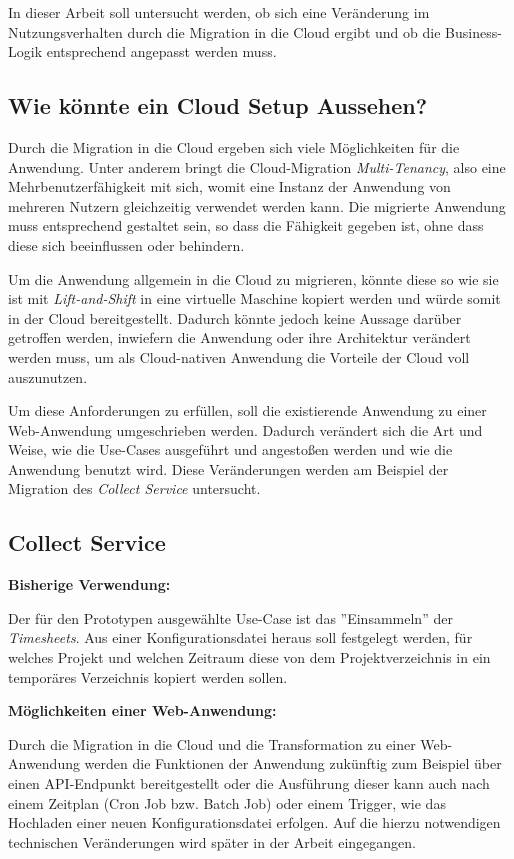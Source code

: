 In dieser Arbeit soll untersucht werden, ob sich eine Veränderung im Nutzungsverhalten durch die Migration in die Cloud ergibt und ob die Business-Logik entsprechend angepasst werden muss. \pagebreak

\subsection{Wie könnte ein Cloud Setup Aussehen?}
Durch die Migration in die Cloud ergeben sich viele Möglichkeiten für die Anwendung. Unter anderem bringt die Cloud-Migration \textit{\gls{Multi-Tenancy}}, also eine Mehrbenutzerfähigkeit mit sich, womit eine Instanz der Anwendung von mehreren Nutzern gleichzeitig verwendet werden kann. Die migrierte Anwendung muss entsprechend gestaltet sein, so dass die Fähigkeit gegeben ist, ohne dass diese sich beeinflussen oder behindern.

Um die Anwendung allgemein in die Cloud zu migrieren, könnte diese so wie sie ist mit \textit{Lift-and-Shift} in eine virtuelle Maschine kopiert werden und würde somit in der Cloud bereitgestellt. Dadurch könnte jedoch keine Aussage darüber getroffen werden, inwiefern die Anwendung oder ihre Architektur verändert werden muss, um als Cloud-nativen Anwendung die Vorteile der Cloud voll auszunutzen.

Um diese Anforderungen zu erfüllen, soll die existierende Anwendung zu einer Web-Anwendung umgeschrieben werden. Dadurch verändert sich die Art und Weise, wie die Use-Cases ausgeführt und angestoßen werden und wie die Anwendung benutzt wird. Diese Veränderungen werden am Beispiel der Migration des \textit{Collect Service} untersucht.

\subsection{Collect Service}
\textbf{Bisherige Verwendung:}

Der für den Prototypen ausgewählte Use-Case ist das ''Einsammeln'' der \textit{\glspl{Timesheet}}. Aus einer Konfigurationsdatei heraus soll festgelegt werden, für welches Projekt und welchen Zeitraum diese von dem Projektverzeichnis in ein temporäres Verzeichnis kopiert werden sollen. 

\textbf{Möglichkeiten einer Web-Anwendung:}

Durch die Migration in die Cloud und die Transformation zu einer Web-Anwendung werden die Funktionen der Anwendung zukünftig zum Beispiel über einen API-Endpunkt bereitgestellt oder die Ausführung dieser kann auch nach einem Zeitplan (Cron Job bzw. Batch Job) oder einem Trigger, wie das Hochladen einer neuen Konfigurationsdatei erfolgen. Auf die hierzu notwendigen technischen Veränderungen wird später in der Arbeit eingegangen. \pagebreak

